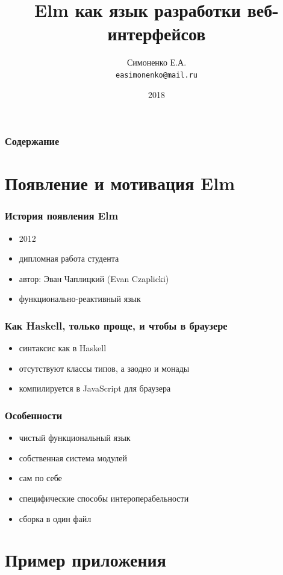 \documentclass[11pt,aspectratio=169]{beamer}
\begin{document}
\author{Симоненко Е.А. \\ \texttt{easimonenko@mail.ru}}
\title{Elm как язык разработки веб-интерфейсов}
\date{2018}

\begin{frame}
\titlepage
\end{frame}

\begin{frame}
\frametitle{Содержание}
\tableofcontents
\end{frame}

\section{Появление и мотивация Elm}

\begin{frame}
\frametitle{История появления Elm}
\begin{itemize}
	\item 2012
	\item дипломная работа студента
	\item автор: Эван Чаплицкий (Evan Czaplicki)
	\item функционально-реактивный язык
\end{itemize}
\end{frame}

\begin{frame}
\frametitle{Как Haskell, только проще, и чтобы в браузере}
\begin{itemize}
	\item синтаксис как в Haskell
	\item отсутствуют классы типов, а заодно и монады
	\item компилируется в JavaScript для браузера
\end{itemize}
\end{frame}

\begin{frame}
\frametitle{Особенности}
\begin{itemize}
	\item чистый функциональный язык
	\item собственная система модулей
	\item сам по себе
	\item специфические способы интероперабельности
	\item сборка в один файл
\end{itemize}
\end{frame}

\section{Пример приложения}
\end{document}
